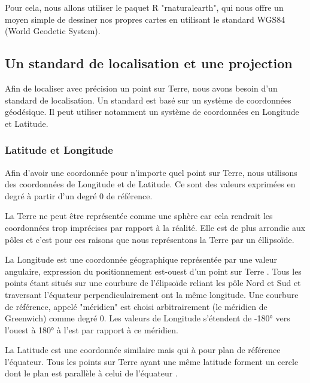 \documentclass{article}
\begin{document}
Pour cela, nous allons utiliser le paquet R "rnaturalearth", qui nous offre un moyen simple de dessiner nos propres cartes en utilisant le standard WGS84 (World Geodetic System).

\subsection{Un standard de localisation et une projection}

Afin de localiser avec précision un point sur Terre, nous avons besoin d'un standard de localisation. Un standard est basé sur un système de coordonnées géodésique. Il peut utiliser notamment un système de coordonnées en Longitude et Latitude.

\subsubsection{Latitude et Longitude}

Afin d'avoir une coordonnée pour n'importe quel point sur Terre, nous utilisons des coordonnées de Longitude et de Latitude. Ce sont des valeurs exprimées en degré à partir d'un degré 0 de référence.

La Terre ne peut être représentée comme une sphère car cela rendrait les coordonnées trop imprécises par rapport à la réalité. Elle est de plus arrondie aux pôles et c'est pour ces raisons que nous représentons la Terre par un éllipsoïde. 

La Longitude est une coordonnée géographique représentée par une valeur angulaire, expression du positionnement est-ouest d'un point sur Terre \cite{frwiki:188614923}. Tous les points étant situés sur une courbure de l'élipsoïde reliant les pôle Nord et Sud et traversant l'équateur     perpendiculairement ont la même longitude. Une courbure de référence, appelé "méridien" est choisi arbitrairement (le méridien de Greenwich) comme degré 0. Les valeurs de Longitude s'étendent de -180° vers l'ouest à 180° à l'est par rapport à ce méridien. 

La Latitude est une coordonnée similaire mais qui à pour plan de référence l'équateur. Tous les points sur Terre ayant une même latitude forment un cercle dont le plan est parallèle à celui de l'équateur \cite{frwiki:189341688}. 
\end{document}
